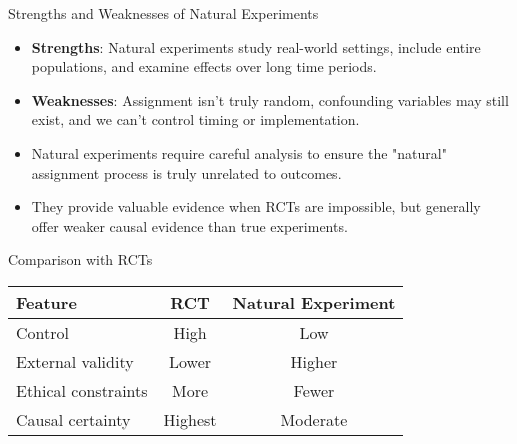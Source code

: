 \documentclass{beamer}
\begin{document}
	\begin{frame}{Strengths and Weaknesses of Natural Experiments}
		\begin{itemize}
			\item \textbf{Strengths}: Natural experiments study real-world settings, include entire populations, and examine effects over long time periods.
			\item \textbf{Weaknesses}: Assignment isn't truly random, confounding variables may still exist, and we can't control timing or implementation.
			\item Natural experiments require careful analysis to ensure the "natural" assignment process is truly unrelated to outcomes.
			\item They provide valuable evidence when RCTs are impossible, but generally offer weaker causal evidence than true experiments.
		\end{itemize}
		
		\begin{block}{Comparison with RCTs}
			\begin{tabular}{l|c|c}
				\textbf{Feature} & \textbf{RCT} & \textbf{Natural Experiment} \\
				\hline
				Control & High & Low \\
				External validity & Lower & Higher \\
				Ethical constraints & More & Fewer \\
				Causal certainty & Highest & Moderate \\
			\end{tabular}
		\end{block}
	\end{frame}
	
\end{document}
